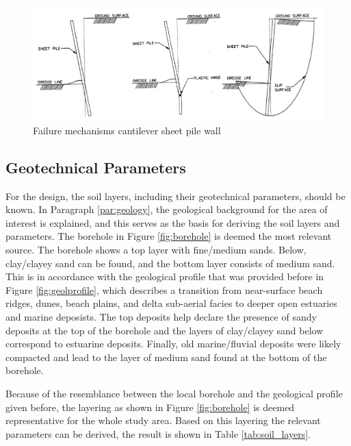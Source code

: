 \begin{figure}[H]
    \centering
    \includegraphics[width=0.90\linewidth]{figures/ch8/failure_mechanisms.png}
    \caption{Failure mechanisms cantilever sheet pile wall}
    \label{fig:failure_mechanisms_sheetpiles}
\end{figure}


\subsection{Geotechnical Parameters}
\label{section:geotechnical_parameters}

For the design, the soil layers, including their geotechnical parameters, should be known. In Paragraph \ref{par:geology}, the geological background for the area of interest is explained, and this serves as the basis for deriving the soil layers and parameters. The borehole in Figure \ref{fig:borehole} is deemed the most relevant source. The borehole shows a top layer with fine/medium sands. Below, clay/clayey sand can be found, and the bottom layer consists of medium sand. This is in accordance with the geological profile that was provided before in Figure \ref{fig:geolprofile}, which describes a transition from near-surface beach ridges, dunes, beach plains, and delta sub-aerial facies to deeper open estuaries and marine deposists. The top deposits help declare the presence of sandy deposits at the top of the borehole and the layers of clay/clayey sand below correspond to estuarine deposits. Finally, old marine/fluvial deposits were likely compacted and lead to the layer of medium sand found at the bottom of the borehole.

Because of the resemblance between the local borehole and the geological profile given before, the layering as shown in Figure \ref{fig:borehole} is deemed representative for the whole study area. Based on this layering the relevant parameters can be derived, the result is shown in Table \ref{tab:soil_layers}.

